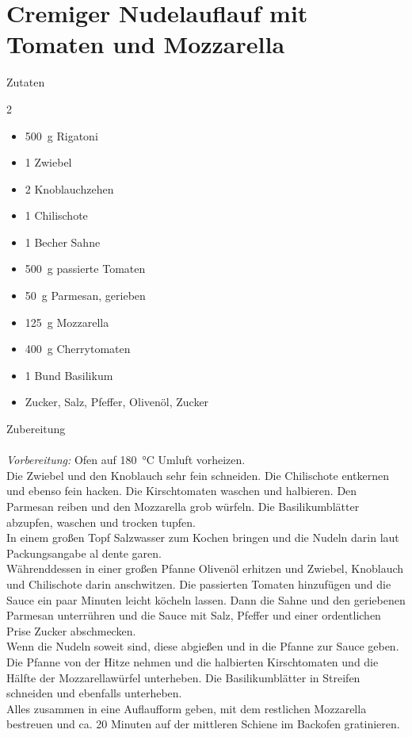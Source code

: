 \section*{Cremiger Nudelauflauf mit Tomaten und Mozzarella}
\ihead{}\ohead{}
\cfoot{}
{\Large Zutaten}
\begin{multicols}{2}
\begin{itemize}
    \item \SI{500}{g} Rigatoni
    \item \num{1} Zwiebel
    \item \num{2} Knoblauchzehen
    \item \num{1} Chilischote
    \item \num{1} Becher Sahne
    \item \SI{500}{g} passierte Tomaten
    \item \SI{50}{g} Parmesan, gerieben
    \item \SI{125}{g} Mozzarella
    \item \SI{400}{g} Cherrytomaten
    \item \num{1} Bund Basilikum
    \item Zucker, Salz, Pfeffer, Olivenöl, Zucker
\end{itemize}
\end{multicols}
\noindent
{\Large Zubereitung}\\
\\
\textit{Vorbereitung:} Ofen auf \SI{180}{\celsius} Umluft vorheizen.\\
Die Zwiebel und den Knoblauch sehr fein schneiden.
Die Chilischote entkernen und ebenso fein hacken.
Die Kirschtomaten waschen und halbieren.
Den Parmesan reiben und den Mozzarella grob würfeln.
Die Basilikumblätter abzupfen, waschen und trocken tupfen.\\
In einem großen Topf Salzwasser zum Kochen bringen und die Nudeln darin laut Packungsangabe al dente garen.\\
Währenddessen in einer großen Pfanne Olivenöl erhitzen und Zwiebel, Knoblauch und Chilischote darin anschwitzen.
Die passierten Tomaten hinzufügen und die Sauce ein paar Minuten leicht köcheln lassen.
Dann die Sahne und den geriebenen Parmesan unterrühren und die Sauce mit Salz, Pfeffer und einer ordentlichen Prise Zucker abschmecken.\\
Wenn die Nudeln soweit sind, diese abgießen und in die Pfanne zur Sauce geben.
Die Pfanne von der Hitze nehmen und die halbierten Kirschtomaten und die Hälfte der Mozzarellawürfel unterheben.
Die Basilikumblätter in Streifen schneiden und ebenfalls unterheben.\\
Alles zusammen in eine Auflaufform geben, mit dem restlichen Mozzarella bestreuen und ca. 20 Minuten auf der mittleren Schiene im Backofen gratinieren.
